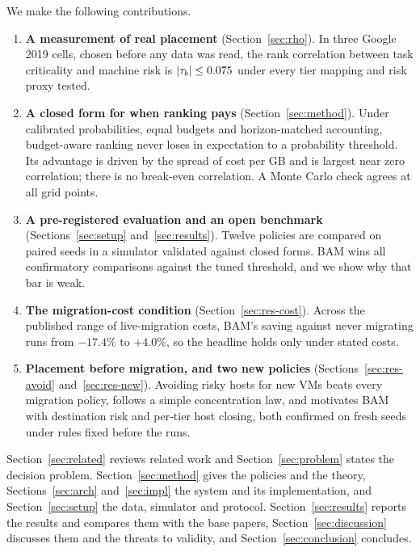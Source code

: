\documentclass[pdflatex,sn-mathphys-num,iicol]{sn-jnl}
\theoremstyle{thmstyleone}%
\theoremstyle{thmstylethree}%
\begin{document}
We make the following contributions.
\begin{enumerate}
\item \textbf{A measurement of real placement} (Section~\ref{sec:rho}). In three Google 2019
cells, chosen before any data was read, the rank correlation between task criticality and machine
risk is $|\tau_b| \le 0.075$ under every tier mapping and risk proxy tested.
\item \textbf{A closed form for when ranking pays} (Section~\ref{sec:method}). Under calibrated
probabilities, equal budgets and horizon-matched accounting, budget-aware ranking never loses in
expectation to a probability threshold. Its advantage is driven by the spread of cost per GB and is
largest near zero correlation; there is no break-even correlation. A Monte Carlo check agrees at
all \VTheoryPoints{} grid points.
\item \textbf{A pre-registered evaluation and an open benchmark} (Sections~\ref{sec:setup}
and~\ref{sec:results}). Twelve policies are compared on paired seeds in a simulator validated
against closed forms. BAM wins all \VFamilySize{} confirmatory comparisons against the tuned
threshold, and we show why that bar is weak.
\item \textbf{The migration-cost condition} (Section~\ref{sec:res-cost}). Across the published
range of live-migration costs, BAM's saving against never migrating runs from $-17.4\%$ to
$+4.0\%$, so the headline holds only under stated costs.
\item \textbf{Placement before migration, and two new policies} (Sections~\ref{sec:res-avoid}
and~\ref{sec:res-new}). Avoiding risky hosts for new VMs beats every migration policy, follows a
simple concentration law, and motivates BAM with destination risk and per-tier host closing, both
confirmed on fresh seeds under rules fixed before the runs.
\end{enumerate}

Section~\ref{sec:related} reviews related work and Section~\ref{sec:problem} states the decision
problem. Section~\ref{sec:method} gives the policies and the theory, Sections~\ref{sec:arch}
and~\ref{sec:impl} the system and its implementation, and Section~\ref{sec:setup} the data,
simulator and protocol. Section~\ref{sec:results} reports the results and compares them with the
base papers, Section~\ref{sec:discussion} discusses them and the threats to validity, and
Section~\ref{sec:conclusion} concludes.

\end{document}
